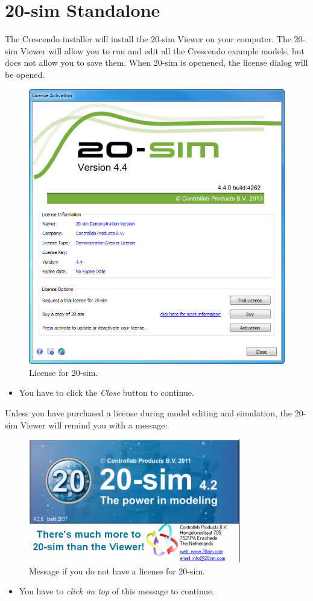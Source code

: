 \documentclass{crescendorepchap}
\begin{document}
\section{20-sim Standalone}

The Crescendo installer will install the 20-sim Viewer on your computer.
The 20-sim Viewer will allow you to run and edit all the Crescendo example
models, but does not allow you to save them. When 20-sim is openened,
the license dialog will be opened.

\begin{figure}[htbp]
\centering
\includegraphics[width=.4\textwidth]{images/20simLicense.png}
\caption{License for 20-sim.}
\end{figure}

\begin{itemize}
\item
  You have to click the \emph{Close} button to continue.
\end{itemize}

Unless you have purchased a license during model editing and
simulation, the 20-sim Viewer will remind you with a message:

\begin{figure}[htbp]
\centering
\includegraphics[width=.6\textwidth]{images/20simViewer.png}
\caption{Message if you do not have a license for 20-sim.}
\end{figure}

\begin{itemize}
\item
  You have to \emph{click on top} of this message to continue.
\end{itemize}
\end{document}
